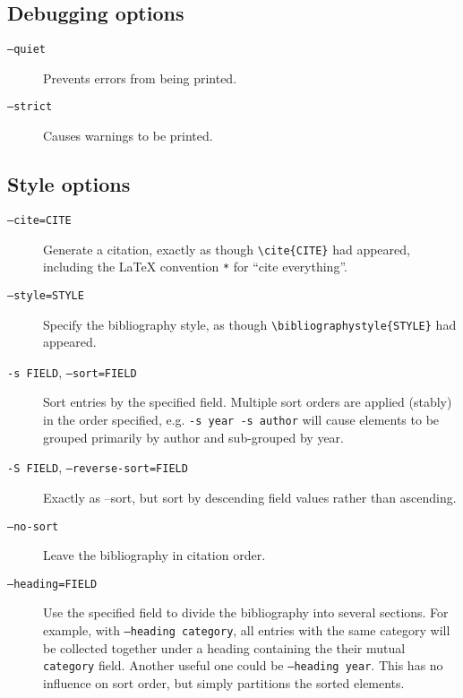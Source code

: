 \documentclass{article}
\begin{document}
\subsection{Debugging options}

\begin{description}
\item[\texttt{--quiet}]
Prevents errors from being printed.

\item[\texttt{--strict}]
Causes warnings to be printed.
\end{description}


\subsection{Style options}

\begin{description}
\item[\texttt{--cite=CITE}]
Generate a citation, exactly as though \texttt{\textbackslash{}cite\{CITE\}} had appeared, including the \LaTeX{} convention \texttt{*} for ``cite everything''.

\item[\texttt{--style=STYLE}]
Specify the bibliography style, as though \texttt{\textbackslash{}bibliographystyle\{STYLE\}} had appeared.

\item[\texttt{-s FIELD}, \texttt{--sort=FIELD}]
Sort entries by the specified field. Multiple sort orders are applied (stably) in the order specified, e.g. \texttt{-s year -s author} will cause elements to be grouped primarily by author and sub-grouped by year.

\item[\texttt{-S FIELD}, \texttt{--reverse-sort=FIELD}]
Exactly as --sort, but sort by descending field values rather than ascending.

\item[\texttt{--no-sort}]
Leave the bibliography in citation order.

\item[\texttt{--heading=FIELD}]
Use the specified field to divide the bibliography into several sections. For example, with \texttt{--heading category}, all entries with the same category will be collected together under a heading containing the their mutual \texttt{category} field. Another useful one could be \texttt{--heading year}. This has no influence on sort order, but simply partitions the sorted elements.


\end{description}
\end{document}
